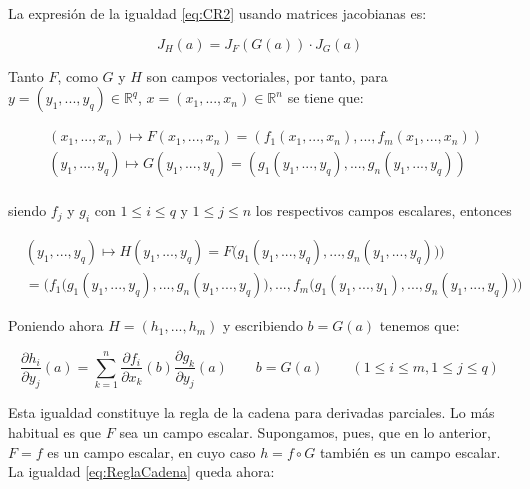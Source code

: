        \noindent La expresión de la igualdad \eqref{eq:CR2} usando matrices jacobianas es:
        
        \begin{equation}
            J_H(a) = J_{F}(G(a)) \cdot J_{G}(a)
        \end{equation}
        
        \noindent Tanto $F$, como $G$ y $H$ son campos vectoriales, por tanto, para ${y = (y_1,...,y_q) \in \mathbb{R}^q}$, ${x = (x_1,...,x_n) \in \mathbb{R}^n}$ se tiene que:
        
        \begin{equation}
            \begin{aligned}
            & (x_1,...,x_n) \mapsto F(x_1,...,x_n) = (f_1(x_1,...,x_n),...,f_m(x_1,...,x_n)) \\
            & (y_1,...,y_q) \mapsto G(y_1,...,y_q) = (g_1(y_1,...,y_q),...,g_n(y_1,...,y_q)) \\
            \end{aligned}
        \end{equation}
        
        \noindent siendo $f_j$ y $g_i$ con $1 \leq i \leq q$ y $1 \leq j \leq n$ los respectivos campos escalares, entonces
                
        \begin{equation}
            \begin{aligned}
            & (y_1,...,y_q) \mapsto H(y_1,...,y_q)  = F\Big(g_1(y_1,...,y_q),...,g_n(y_1,...,y_q))\Big) \\
            & = \Bigg(f_1\Big(g_1(y_1,...,y_q),...,g_n(y_1,...,y_q)\Big),..., f_m\Big(g_1(y_1,...,y_1),...,g_n(y_1,...,y_q)\Big)\Bigg)
            \end{aligned}
        \end{equation}
        
        \noindent Poniendo ahora $H=(h_1,...,h_m)$ y escribiendo $b = G(a)$ tenemos que:
        
        \begin{equation}\label{eq:ReglaCadena}
            \frac{\partial h_i}{\partial y_j}(a) = \sum_{k=1}^{n} \frac{\partial f_i}{\partial x_k}(b)\frac{\partial g_k}{\partial y_j}(a) \qquad b = G(a) \qquad (1 \leq i \leq m, 1 \leq j \leq q )
        \end{equation}
         
         Esta igualdad constituye la regla de la cadena para derivadas parciales. Lo más habitual es que $F$ sea un campo escalar. Supongamos, pues, que en lo anterior, $F=f$ es un campo escalar, en cuyo caso $h=f \circ G$ también es un campo escalar. La igualdad \eqref{eq:ReglaCadena} queda ahora:
         
